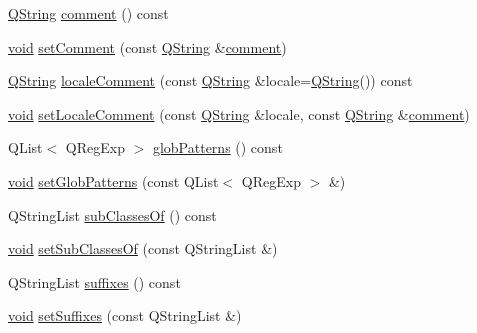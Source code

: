 \begin{DoxyCompactItemize}
\hyperlink{group___u_a_v_objects_plugin_gab9d252f49c333c94a72f97ce3105a32d}{\-Q\-String} \hyperlink{group___core_plugin_ga79389186e4424fcc76067de828c59672}{comment} () const 
\item 
\hyperlink{group___u_a_v_objects_plugin_ga444cf2ff3f0ecbe028adce838d373f5c}{void} \hyperlink{group___core_plugin_gaeb4813225c69cf8b6d4519ff37f86bb3}{set\-Comment} (const \hyperlink{group___u_a_v_objects_plugin_gab9d252f49c333c94a72f97ce3105a32d}{\-Q\-String} \&\hyperlink{group___core_plugin_ga79389186e4424fcc76067de828c59672}{comment})
\item 
\hyperlink{group___u_a_v_objects_plugin_gab9d252f49c333c94a72f97ce3105a32d}{\-Q\-String} \hyperlink{group___core_plugin_gacec6ccfecf75f30c7cecc08ba360a567}{locale\-Comment} (const \hyperlink{group___u_a_v_objects_plugin_gab9d252f49c333c94a72f97ce3105a32d}{\-Q\-String} \&locale=\hyperlink{group___u_a_v_objects_plugin_gab9d252f49c333c94a72f97ce3105a32d}{\-Q\-String}()) const 
\item 
\hyperlink{group___u_a_v_objects_plugin_ga444cf2ff3f0ecbe028adce838d373f5c}{void} \hyperlink{group___core_plugin_ga6d1b6c3bf83a61abcca664ffbe0b7817}{set\-Locale\-Comment} (const \hyperlink{group___u_a_v_objects_plugin_gab9d252f49c333c94a72f97ce3105a32d}{\-Q\-String} \&locale, const \hyperlink{group___u_a_v_objects_plugin_gab9d252f49c333c94a72f97ce3105a32d}{\-Q\-String} \&\hyperlink{group___core_plugin_ga79389186e4424fcc76067de828c59672}{comment})
\item 
\-Q\-List$<$ \-Q\-Reg\-Exp $>$ \hyperlink{group___core_plugin_ga5003d7a7007c7a14897a64179875f2e6}{glob\-Patterns} () const 
\item 
\hyperlink{group___u_a_v_objects_plugin_ga444cf2ff3f0ecbe028adce838d373f5c}{void} \hyperlink{group___core_plugin_ga7634b7f467d1dbe58df833d12d160733}{set\-Glob\-Patterns} (const \-Q\-List$<$ \-Q\-Reg\-Exp $>$ \&)
\item 
\-Q\-String\-List \hyperlink{group___core_plugin_ga5cc67af21852909a1753c6a8caabed43}{sub\-Classes\-Of} () const 
\item 
\hyperlink{group___u_a_v_objects_plugin_ga444cf2ff3f0ecbe028adce838d373f5c}{void} \hyperlink{group___core_plugin_gab0ed6090ea2741206e77162c0b61345b}{set\-Sub\-Classes\-Of} (const \-Q\-String\-List \&)
\item 
\-Q\-String\-List \hyperlink{group___core_plugin_ga7adb5769df4eda33d940128aef849580}{suffixes} () const 
\item 
\hyperlink{group___u_a_v_objects_plugin_ga444cf2ff3f0ecbe028adce838d373f5c}{void} \hyperlink{group___core_plugin_ga37606c8c750409e81f32e8f168c846dd}{set\-Suffixes} (const \-Q\-String\-List \&)

\end{DoxyCompactItemize}
